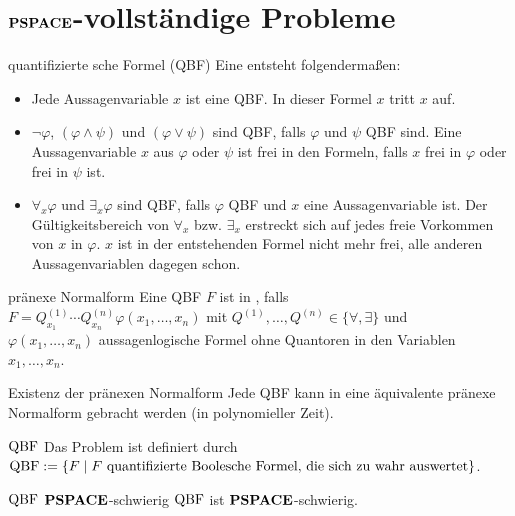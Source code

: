 \pagebreak

\section{%
    \texorpdfstring{$\mathbf{PSPACE}$}{PSPACE}-vollständige Probleme%
}

\begin{Def}{quantifizierte sche Formel (QBF)}
    Eine  entsteht folgendermaßen:
    \begin{itemize}
        \item
        Jede Aussagenvariable $x$ ist eine QBF.
        In dieser Formel $x$ tritt $x$  auf.

        \item
        $\lnot \varphi$, $(\varphi \land \psi)$ und $(\varphi \lor \psi)$ sind QBF,
        falls $\varphi$ und $\psi$ QBF sind.
        Eine Aussagenvariable $x$ aus $\varphi$ oder $\psi$ ist frei in den Formeln,
        falls $x$ frei in $\varphi$ oder frei in $\psi$ ist.

        \item
        $\forall_x \varphi$ und $\exists_x \varphi$ sind QBF,
        falls $\varphi$ QBF und $x$ eine Aussagenvariable ist.
        Der Gültigkeitsbereich von $\forall_x$ bzw. $\exists_x$ erstreckt sich auf jedes
        freie Vorkommen von $x$ in $\varphi$.
        $x$ ist in der entstehenden Formel nicht mehr frei,
        alle anderen Aussagenvariablen dagegen schon.
    \end{itemize}
\end{Def}

\begin{Def}{pränexe Normalform}
    Eine QBF $F$ ist in , falls\\
    $F = Q^{(1)}_{x_1} \dotsb Q^{(n)}_{x_n} \varphi(x_1, \dotsc, x_n)$ mit
    $Q^{(1)}, \dotsc, Q^{(n)} \in \{\forall, \exists\}$ und\\
    $\varphi(x_1, \dotsc, x_n)$ aussagenlogische Formel ohne Quantoren in den Variablen
    $x_1, \dotsc, x_n$.
\end{Def}

\begin{Satz}{Existenz der pränexen Normalform}
    Jede QBF kann in eine äquivalente pränexe Normalform gebracht werden
    (in polynomieller Zeit).
\end{Satz}

\linie

\begin{Def}{$\QBF$}
    Das Problem \begriff{$\QBF$} ist definiert durch\\
    $\text{QBF} := \{F \;|\; F \text{ quantifizierte Boolesche Formel, die sich zu wahr auswertet}\}$.
\end{Def}

\begin{Satz}{$\QBF$ $\mathbf{PSPACE}$-schwierig}
    $\QBF$ ist $\mathbf{PSPACE}$-schwierig.
\end{Satz}

\pagebreak
